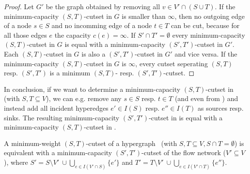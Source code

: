 \begin{proof}
Let $G'$ be the graph obtained by removing all $v \in V' \cap (S \cup T)$. If
the minimum-capacity $(S,T)$-cutset in $G$ is smaller than $\infty$, then no outgoing
edge of a node $s \in S$ and no incomming edge of a node $t \in T$ can be cut, because for all
those edges $e$ the capacity $c(e) = \infty$. If $S' \cap T' = \emptyset$ every
minimum-capacity $(S,T)$-cutset in $G$ is equal with a minimum-capacity $(S',T')$-cutset
in $G'$. 
Each $(S,T)$-cutset in $G$ is also a $(S',T')$-cutset in $G'$ and vice versa.
If the minimum-capacity $(S,T)$-cutset in $G$ is $\infty$, every cutset seperating
$(S,T)$ resp. $(S',T')$ is a minimum $(S,T)$- resp. $(S',T')$-cutset.
\end{proof}

In conclusion, if we want to determine a minimum-capacity $(S,T)$-cutset
in  (with $S,T \subseteq V$), we can e.g. remove any $s \in S$ resp. $t \in T$ 
(and even from ) and instead add all incident 
hyperedges $e' \in I(S)$ resp. $e'' \in I(T)$ as sources resp. sinks. The resulting 
minimum-capacity $(S',T')$-cutset in  is equal with a minimum-capacity $(S,T)$-cutset
in . 

\begin{theorem}
\label{theorem:st_cutset_equal}
A minimum-weight $(S,T)$-cutset of a hypergraph \HypergraphDef~(with $S,T \subseteq V,
S \cap T = \emptyset$) is equivalent with a minimum-capacity $(S',T')$-cutset of the
flow network  ($V' \subseteq V$), where $S' = S \setminus V'\ \cup \bigcup\limits_{e \in I(V' \cap S)} \{e'\}$ and 
$T' = T \setminus V'\ \cup \bigcup\limits_{e \in I(V'\cap T)} \{e''\}$.
\label{theorem:heuer_network}
\end{theorem}

